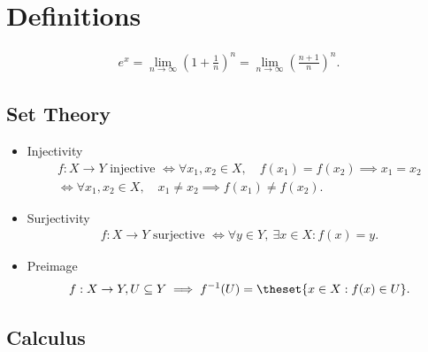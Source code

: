 \hypertarget{definitions-4}{%
\section{Definitions}\label{definitions-4}}

\begin{align*}  
e^x = \lim_{n \to \infty} \left(1 + \frac{1}{n}\right)^n = \lim_{n \to \infty} \left( \frac{n+1}{n} \right)^n
.\end{align*}

\hypertarget{set-theory}{%
\subsection{Set Theory}\label{set-theory}}

\begin{itemize}
\item
  Injectivity
  \begin{align*}  
  f:X \to Y \text{ injective } \iff \forall x_1,x_2 \in X,\quad  f(x_1) = f(x_2) \implies x_1 = x_2 \\ \iff \forall x_1,x_2 \in X,\quad x_1 \neq x_2 \implies f(x_1) \neq f(x_2)
  .\end{align*}
\item
  Surjectivity
  \begin{align*}  
  f:X \to Y \text{ surjective } \iff \forall y\in Y,~ \exists x\in X : f(x) = y
  .\end{align*}
\item
  Preimage
  \begin{align*}  
  f:X \to Y, U \subseteq Y \implies f^{-1}(U) = \theset{x \in X : f(x) \in U}
  .\end{align*}
\end{itemize}

\hypertarget{calculus}{%
\subsection{Calculus}\label{calculus}}

